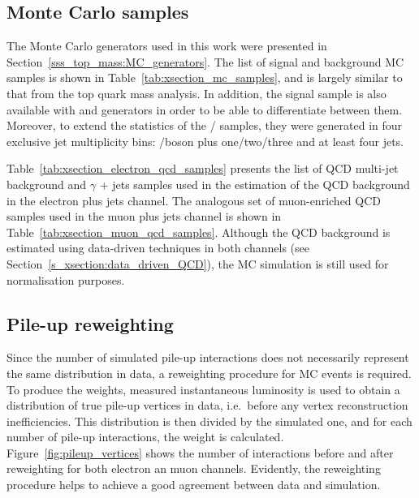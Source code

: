 \subsection{Monte Carlo samples}
\label{ss_xsection:MC_samples}
The Monte Carlo generators used in this work were presented in Section~\ref{sss_top_mass:MC_generators}. The list of
signal and background MC samples is shown in Table~\ref{tab:xsection_mc_samples}, and is largely similar to that from
the top quark mass analysis. In addition, the signal \ttjets sample is also available with \POWHEG and \MCATNLO
generators in order to be able to differentiate between them. Moreover, to extend the statistics of the \W/\ZpJets
samples, they were generated in four exclusive jet multiplicity bins: \W/\Z boson plus one/two/three and at least four
jets.

Table~\ref{tab:xsection_electron_qcd_samples} presents the list of QCD multi-jet background and $\gamma$ + jets samples
used in the estimation of the QCD background in the electron plus jets channel. The analogous set of muon-enriched QCD
samples used in the muon plus jets channel is shown in Table~\ref{tab:xsection_muon_qcd_samples}. Although the QCD
background is estimated using data-driven techniques in both channels (see Section~\ref{s_xsection:data_driven_QCD}),
the MC simulation is still used for normalisation purposes.



\subsection{Pile-up reweighting}
\label{sss_xsection:pileup_reweighting}
Since the number of simulated pile-up interactions does not necessarily represent the same distribution in data, a
reweighting procedure for MC events is required. To produce the weights, measured instantaneous luminosity is used to
obtain a distribution of true pile-up vertices in data, i.e.\ before any vertex reconstruction inefficiencies. This
distribution is then divided by the simulated one, and for each number of pile-up interactions, the weight is
calculated. Figure~\ref{fig:pileup_vertices} shows the number of interactions before and after reweighting for both
electron an muon channels. Evidently, the reweighting procedure helps to achieve a good agreement between data and
simulation.

